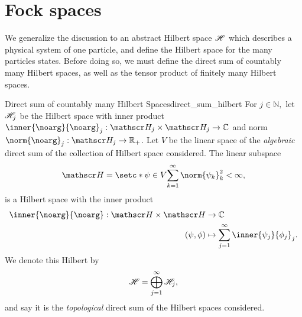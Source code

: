 \section{Fock spaces}
We generalize the discussion to an abstract Hilbert space \(\mathscr{H}\) which describes a physical system of one particle, and define the Hilbert space for the many particles states. Before doing so, we must define the direct sum of countably many Hilbert spaces, as well as the tensor product of finitely many Hilbert spaces.

\begin{proposition}{Direct sum of countably many Hilbert Spaces}{direct_sum_hilbert}
    For \(j \in \mathbb{N},\) let \(\mathscr{H}_j\) be the Hilbert space with inner product \(\inner{\noarg}{\noarg}_j : \hilbert_j \times \hilbert_j \to \mathbb{C}\) and norm \(\norm{\noarg}_j : \hilbert_j \to \mathbb{R}_+\). Let \(V\) be the linear space of the \emph{algebraic} direct sum of the collection of Hilbert space considered. The linear subspace
    \begin{equation*}
        \hilbert =  \setc*{\psi \in V}{\sum_{k = 1}^\infty{\norm{\psi_k}_k^2 < \infty}},
    \end{equation*}
    is a Hilbert space with the inner product
    \begin{align*}
        \inner{\noarg}{\noarg} : \hilbert \times \hilbert &\to \mathbb{C}\\
                                              (\psi,\phi) &\mapsto \sum_{j = 1}^\infty \inner{\psi_j}{\phi_j}_j.
    \end{align*}
    We denote this Hilbert by 
    \begin{equation*}
        \mathscr{H} = \bigoplus_{j = 1}^\infty{\mathscr{H}_j},
    \end{equation*}
    and say it is the \emph{topological} direct sum of the Hilbert spaces considered.
\end{proposition}
